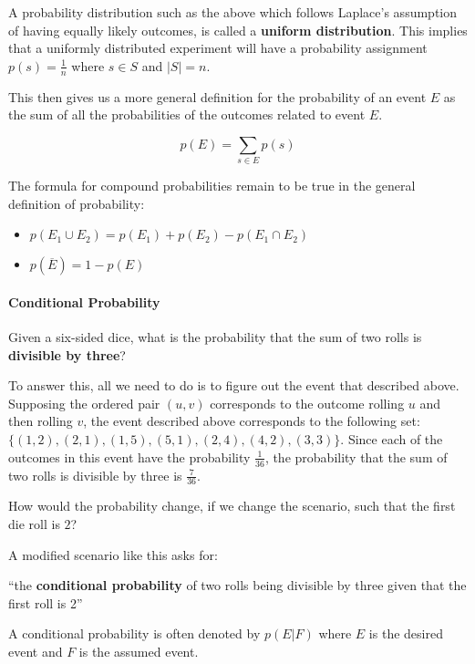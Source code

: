 A probability distribution such as the above which follows Laplace's
assumption of having equally likely outcomes, is called a
\textbf{uniform distribution}. This implies that a uniformly distributed
experiment will have a probability assignment
\textbf{\(p(s)=\frac{1}{n}\)} where \textbf{\(s \in S\)} and
\textbf{\(|S|=n\)}.

This then gives us a more general definition for the probability of an
event \textbf{\(E\)} as the sum of all the probabilities of the outcomes
related to event \textbf{\(E\)}.

\[
p(E)=\sum_{s \in E}{p(s)}
\]

The formula for compound probabilities remain to be true in the general
definition of probability:

\begin{itemize}
\tightlist
\item
  \textbf{\(p(E_1 \cup E_2)=p(E_1)+p(E_2)-p(E_1 \cap E_2)\)}
\item
  \textbf{\(p(\overline{E})=1-p(E)\)}
\end{itemize}

\hypertarget{conditional-probability}{%
\paragraph{Conditional Probability}\label{conditional-probability}}

Given a six-sided dice, what is the probability that the sum of two
rolls is \textbf{divisible by three}?

To answer this, all we need to do is to figure out the event that
described above. Supposing the ordered pair \textbf{\((u,v)\)}
corresponds to the outcome rolling \textbf{\(u\)} and then rolling
\textbf{\(v\)}, the event described above corresponds to the following
set: \textbf{\(\{(1,2),(2,1),(1,5),(5,1),(2,4),(4,2),(3,3)\}\)}. Since
each of the outcomes in this event have the probability
\textbf{\(\frac{1}{36}\)}, the probability that the sum of two rolls is
divisible by three is \textbf{\(\frac{7}{36}\)}.

How would the probability change, if we change the scenario, such that
the first die roll is \textbf{\(2\)}?

A modified scenario like this asks for:

``the \textbf{conditional probability} of two rolls being divisible by
three given that the first roll is 2''

A conditional probability is often denoted by \textbf{\(p(E|F)\)} where
\textbf{\(E\)} is the desired event and \textbf{\(F\)} is the assumed
event.

